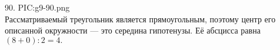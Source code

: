 90. {{PIC:g9-90.png}}\\
Рассматриваемый треугольник является прямоугольным, поэтому центр его описанной окружности --- это середина гипотенузы. Её абсцисса равна $(8+0):2=4.$\\
